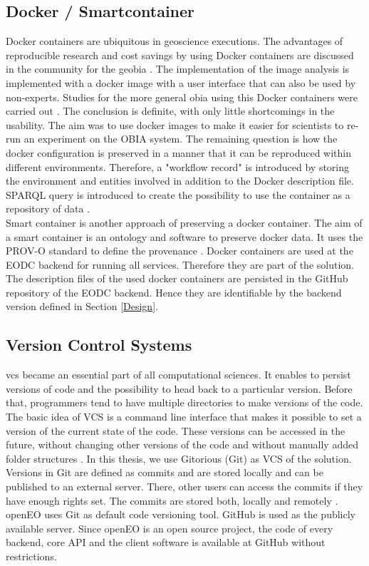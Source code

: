 \documentclass[draft,final]{vutinfth} %
\begin{document}
\subsection{Docker / Smartcontainer}\label{Smartcontainer}
Docker containers are ubiquitous in geoscience executions. The advantages of reproducible research and cost savings by using Docker containers are discussed in the community for the \gls{geobia} \cite{rs9030290}. The implementation of the image analysis is implemented with a docker image with a user interface that can also be used by non-experts. Studies for the more general \gls{obia} using this Docker containers were carried out \cite{proceedings456}. The conclusion is definite, with only little shortcomings in the usability. The aim was to use docker images to make it easier for scientists to re-run an experiment on the OBIA system. The remaining question is how the docker configuration is preserved in a manner that it can be reproduced within different environments. Therefore, a "workflow record" is introduced by storing the environment and entities involved in addition to the Docker description file. SPARQL query is introduced to create the possibility to use the container as a repository of data \cite{emsley2017a}.\\ 
Smart container is another approach of preserving a docker container. The aim of a smart container is an ontology and software to preserve docker data. It uses the PROV-O standard to define the provenance \cite{Huo2015SmartCA}. 
Docker containers are used at the EODC backend for running all services. Therefore they are part of the solution. The description files of the used docker containers are persisted in the GitHub repository of the EODC backend. Hence they are identifiable by the backend version defined in Section \ref{Design}.   

\subsection{Version Control Systems}\label{Version Control Systems}
\gls{vcs} became an essential part of all computational sciences. It enables to persist versions of code and the possibility to head back to a particular version. Before that, programmers tend to have multiple directories to make versions of the code. The basic idea of VCS is a command line interface that makes it possible to set a version of the current state of the code. These versions can be accessed in the future, without changing other versions of the code and without manually added folder structures \cite{10.1109/MCSE.2009.194}. 
In this thesis, we use Gitorious (Git) as VCS of the solution. Versions in Git are defined as commits and are stored locally and can be published to an external server. There, other users can access the commits if they have enough rights set. The commits are stored both, locally and remotely \cite{QuickGit}. openEO uses Git as default code versioning tool. GitHub is used as the publicly available server. Since openEO is an open source project, the code of every backend, core API and the client software is available at GitHub without restrictions. 
\end{document}
